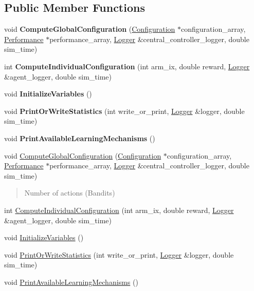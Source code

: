 \subsection*{Public Member Functions}
\begin{DoxyCompactItemize}
\item 
\mbox{\label{classMlModel_a97c9a74675555fd0d6e4442d555ce409}} 
void {\bfseries Compute\+Global\+Configuration} (\hyperlink{structConfiguration}{Configuration} $\ast$configuration\+\_\+array, \hyperlink{structPerformance}{Performance} $\ast$performance\+\_\+array, \hyperlink{structLogger}{Logger} \&central\+\_\+controller\+\_\+logger, double sim\+\_\+time)
\item 
\mbox{\label{classMlModel_aa2657a607e53c8bdc65769885343cabd}} 
int {\bfseries Compute\+Individual\+Configuration} (int arm\+\_\+ix, double reward, \hyperlink{structLogger}{Logger} \&agent\+\_\+logger, double sim\+\_\+time)
\item 
\mbox{\label{classMlModel_ae9244d394c50fe87831a83231d549779}} 
void {\bfseries Initialize\+Variables} ()
\item 
\mbox{\label{classMlModel_a4ae9bc5815eb417053be5355762574c1}} 
void {\bfseries Print\+Or\+Write\+Statistics} (int write\+\_\+or\+\_\+print, \hyperlink{structLogger}{Logger} \&logger, double sim\+\_\+time)
\item 
\mbox{\label{classMlModel_a4e1825000d0d74d900181c031a95e927}} 
void {\bfseries Print\+Available\+Learning\+Mechanisms} ()
\item 
void \hyperlink{classMlModel_a97c9a74675555fd0d6e4442d555ce409}{Compute\+Global\+Configuration} (\hyperlink{structConfiguration}{Configuration} $\ast$configuration\+\_\+array, \hyperlink{structPerformance}{Performance} $\ast$performance\+\_\+array, \hyperlink{structLogger}{Logger} \&central\+\_\+controller\+\_\+logger, double sim\+\_\+time)
\begin{DoxyCompactList}\small\item\em \begin{quote}
Number of actions (Bandits) \end{quote}
\end{DoxyCompactList}\item 
int \hyperlink{classMlModel_aa2657a607e53c8bdc65769885343cabd}{Compute\+Individual\+Configuration} (int arm\+\_\+ix, double reward, \hyperlink{structLogger}{Logger} \&agent\+\_\+logger, double sim\+\_\+time)
\item 
void \hyperlink{classMlModel_ae9244d394c50fe87831a83231d549779}{Initialize\+Variables} ()
\item 
void \hyperlink{classMlModel_a4ae9bc5815eb417053be5355762574c1}{Print\+Or\+Write\+Statistics} (int write\+\_\+or\+\_\+print, \hyperlink{structLogger}{Logger} \&logger, double sim\+\_\+time)
\item 
void \hyperlink{classMlModel_a4e1825000d0d74d900181c031a95e927}{Print\+Available\+Learning\+Mechanisms} ()
\end{DoxyCompactItemize}

